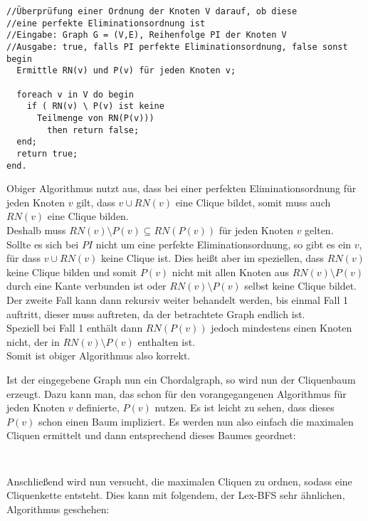 \begin{lstlisting}
//Überprüfung einer Ordnung der Knoten V darauf, ob diese
//eine perfekte Eliminationsordnung ist
//Eingabe: Graph G = (V,E), Reihenfolge PI der Knoten V
//Ausgabe: true, falls PI perfekte Eliminationsordnung, false sonst
begin
  Ermittle RN(v) und P(v) für jeden Knoten v;
 
  foreach v in V do begin
    if ( RN(v) \ P(v) ist keine
      Teilmenge von RN(P(v)))
        then return false;
  end;
  return true;
end.
\end{lstlisting}

Obiger Algorithmus nutzt aus, dass bei einer perfekten Eliminationsordnung für jeden Knoten $v$ gilt, dass ${v} \cup RN(v)$ eine Clique bildet, somit muss auch $RN(v)$ eine Clique bilden.\\
Deshalb muss $RN(v) \setminus P(v) \subseteq RN(P(v))$ für jeden Knoten $v$ gelten.\\
Sollte es sich bei $PI$ nicht um eine perfekte Eliminationsordnung, so gibt es ein $v$, für dass ${v} \cup RN(v)$ keine Clique ist. Dies heißt aber im speziellen, dass $RN(v)$ keine Clique bilden und somit  $P(v)$ nicht mit allen Knoten aus $RN(v) \setminus P(v)$ durch eine Kante verbunden ist oder $RN(v) \setminus P(v)$ selbst keine Clique bildet. Der zweite Fall kann dann rekursiv weiter behandelt werden, bis einmal Fall 1 auftritt, dieser muss auftreten, da der betrachtete Graph endlich ist.\\
Speziell bei Fall 1 enthält dann $RN(P(v))$ jedoch mindestens einen Knoten nicht, der in $RN(v) \setminus P(v)$ enthalten ist.\\
Somit ist obiger Algorithmus also korrekt.

Ist der eingegebene Graph nun ein Chordalgraph, so wird nun der Cliquenbaum erzeugt. Dazu kann man, das schon für den vorangegangenen Algorithmus für jeden Knoten $v$ definierte, $P(v)$ nutzen. Es ist leicht zu sehen, dass dieses $P(v)$ schon einen Baum impliziert. Es werden nun also einfach die maximalen Cliquen ermittelt und dann entsprechend dieses Baumes geordnet:

\begin{lstlisting}


\end{lstlisting}

Anschließend wird nun versucht, die maximalen Cliquen zu ordnen, sodass eine Cliquenkette entsteht. Dies kann mit folgendem, der Lex-BFS sehr ähnlichen, Algorithmus geschehen:

\begin{lstlisting}


\end{lstlisting}

